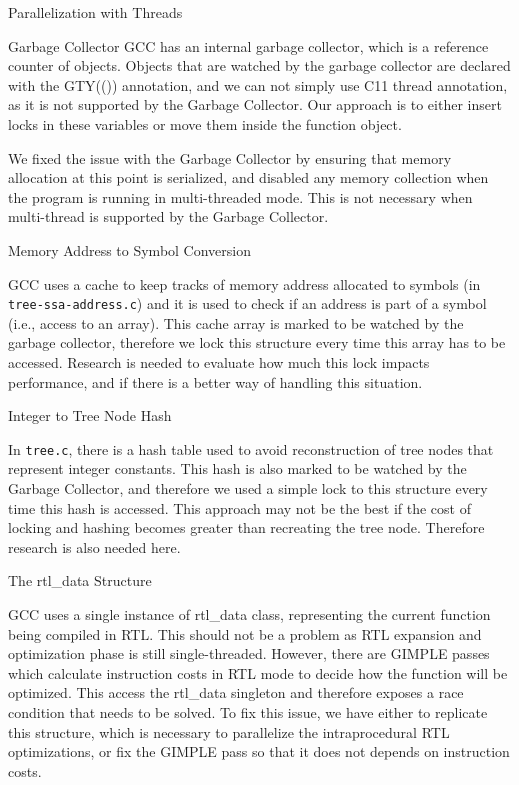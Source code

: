 \begin{section}{Parallelization with Threads}
\begin{subsection}{Garbage Collector}
GCC has an internal garbage collector, which is a reference counter of objects.
Objects that are watched by the garbage collector are declared with the GTY(())
annotation, and we can not simply use C11 thread annotation, as it is not
supported by the Garbage Collector. Our approach is to either insert locks in
these variables or move them inside the function object.

We fixed the issue with the Garbage Collector by ensuring that memory
allocation at this point is serialized, and disabled any memory collection when
the program is running in multi-threaded mode. This is not necessary when
multi-thread is supported by the Garbage Collector.

\end{subsection}

\begin{subsection}{Memory Address to Symbol Conversion}

GCC uses a cache to keep tracks of memory address allocated to symbols (in
\texttt{tree-ssa-address.c}) and it is used to check if an address is part of a symbol
(i.e., access to an array). This cache array is marked to be watched by the
garbage collector, therefore we lock this structure every time this array has
to be accessed. Research is needed to evaluate how much this lock impacts
performance, and if there is a better way of handling this situation. 

\end{subsection}

\begin{subsection}{Integer to Tree Node Hash}

In \texttt{tree.c}, there is a hash table used to avoid reconstruction of tree nodes
that represent integer constants. This hash is also marked to be watched by the
Garbage Collector, and therefore we used a simple lock to this structure every
time this hash is accessed. This approach may not be the best if the cost of
locking and hashing becomes greater than recreating the tree node. Therefore
research is also needed here. 

\end{subsection}

\begin{subsection}{The rtl\_data Structure}

GCC uses a single instance of rtl\_data class, representing the current function
being compiled in RTL. This should not be a problem as RTL expansion
and optimization phase is still single-threaded. However, there are GIMPLE
passes which calculate instruction costs in RTL mode to decide how the function
will be optimized. This access the rtl\_data singleton and therefore exposes a
race condition that needs to be solved. To fix this issue, we have either to
replicate this structure, which is necessary to parallelize the intraprocedural
RTL optimizations, or fix the GIMPLE pass so that it does not depends on
instruction costs. 


\end{subsection}
\end{section}

